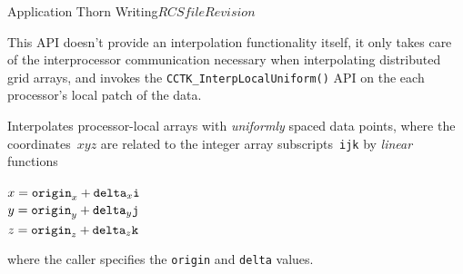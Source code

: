 \begin{cactuspart}{Application Thorn Writing}{$RCSfile$}{$Revision$}
\begin{Lentry}
        This API doesn't provide an interpolation functionality itself,
        it only takes care of the interprocessor communication
        necessary when interpolating distributed grid arrays, and invokes
        the \texttt{CCTK\_InterpLocalUniform()} API on the each processor's
        local patch of the data.
\item[\texttt{CCTK\_InterpLocalUniform()}]
        Interpolates processor-local arrays with \emph{uniformly}
        spaced data points, \ie{} where the coordinates~$xyz$
        are related to the integer array subscripts~\verb|ijk| by
        \emph{linear} functions
        \begin{flushleft}
        $x = \verb|origin|_x + \verb|delta|_x \verb|i|$ \\
        $y = \verb|origin|_y + \verb|delta|_y \verb|j|$ \\
        $z = \verb|origin|_z + \verb|delta|_z \verb|k|$ %
        \end{flushleft}
        where the caller specifies the \verb|origin| and \verb|delta|
        values.
\end{Lentry}


\end{cactuspart}
